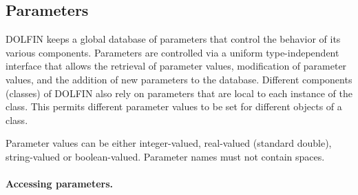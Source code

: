\subsection{Parameters}

DOLFIN keeps a global database of parameters that control the behavior
of its various components. Parameters are controlled via a uniform
type-independent interface that allows the retrieval of parameter
values, modification of parameter values, and the addition of new
parameters to the database. Different components (classes) of DOLFIN
also rely on parameters that are local to each instance of the class.
This permits different parameter values to be set for different
objects of a class.

Parameter values can be either integer-valued, real-valued (standard
double), string-valued or boolean-valued. Parameter
names must not contain spaces.

\paragraph{Accessing parameters.}

